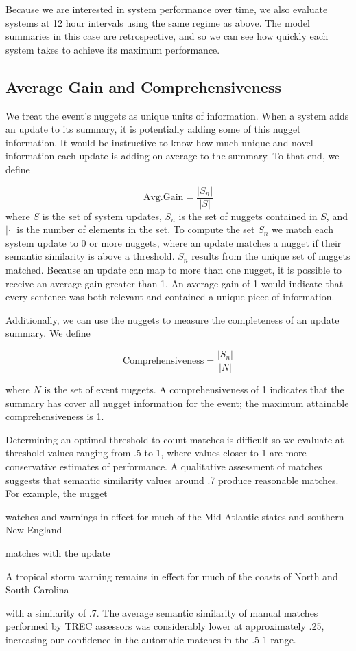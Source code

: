 Because we are interested in system performance over time, we also evaluate 
systems at 12 hour intervals using the same regime as above. 
The model summaries in this case are retrospective, and so we can see how quickly
each system takes to achieve its maximum performance.

\subsection{Average Gain and Comprehensiveness}

 
We treat the event's nuggets as unique units of information.
When a system adds an update to its summary, it is potentially adding some
of this nugget information. It would be instructive to know how much unique
and novel information each update is adding on average to the summary.
To that end, we define

\[ \mathrm{Avg. Gain} = \frac{|S_n|}{|S|}%
\] 
where $S$ is the set of system updates, 
$S_n$ is the set of nuggets contained in $S$, and $|\cdot|$ is the number of
elements in the set.
To compute the set $S_n$ we match each system update to 0 or more nuggets, 
where an update matches a nugget if their semantic similarity is above 
a threshold. $S_n$ results from the unique set of nuggets matched.
Because an update can map to more than one nugget, it is possible to receive an
average gain greater than 1. An average gain of 1 would indicate that every
sentence was both relevant and contained a unique piece of information.



Additionally, we can use the nuggets to measure the completeness of an update 
summary. We define

\[ \mathrm{Comprehensiveness} = \frac{|S_n|}{|N|}\]

where $N$ is the set of event nuggets.
A comprehensiveness of 1 indicates that the summary has cover 
all nugget information for the event; the maximum
attainable comprehensiveness is 1.

Determining an optimal threshold to count matches is difficult so 
we evaluate at 
threshold values ranging
from .5 to 1, where values closer to 1 are more conservative estimates of
performance.
A qualitative assessment of matches 
suggests that semantic similarity values around .7 produce reasonable matches.
For example, the nugget 
\begin{blockquote}
watches and warnings in effect for much of the Mid-Atlantic states and 
southern New England 
\end{blockquote}
\noindent
matches with the update 
\begin{blockquote}
A tropical storm warning remains in effect for much of the coasts 
of North and South Carolina\end{blockquote}
\noindent
with a similarity of .7. 
The average semantic similarity of manual matches performed 
by TREC assessors was considerably lower at approximately .25, increasing
our confidence in the automatic matches in the .5-1 range.

